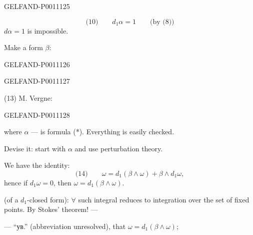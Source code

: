 \begin{GelfandAdjacentEvidence}{GELFAND-P001112}{5}

\[
\text{(10)}\qquad d_1\alpha=1\qquad\text{(by (8))}
\]
$d\alpha=1$ is impossible.

Make a form $\beta$:
\end{GelfandAdjacentEvidence}
\begin{GelfandAdjacentEvidence}{GELFAND-P001112}{6}

\end{GelfandAdjacentEvidence}
\begin{GelfandAdjacentEvidence}{GELFAND-P001112}{7}


(13) M. Vergne:
\end{GelfandAdjacentEvidence}
\begin{GelfandAdjacentEvidence}{GELFAND-P001112}{8}

where $\alpha$ — is formula (*). Everything is easily checked.

Devise it: start with $\alpha$ and use perturbation theory.

We have the identity:
\[
\text{(14)}\qquad
\omega=d_1(\beta\wedge\omega)+\beta\wedge d_1\omega,
\]
hence if $d_1\omega=0$, then $\omega=d_1(\beta\wedge\omega)$.

 (of a $d_1$-closed form):
$\forall$ such integral reduces to integration over the set of fixed points.
By Stokes’ theorem! —

— “ув.” (abbreviation unresolved), that $\omega=d_1(\beta\wedge\omega)$;
\end{GelfandAdjacentEvidence}

